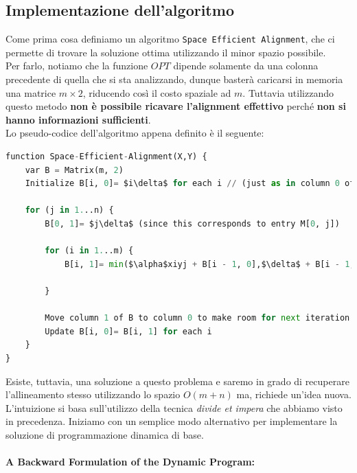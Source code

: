 \subsection{Implementazione dell'algoritmo}

Come prima cosa definiamo un algoritmo
\texttt{Space\ Efficient\ Alignment}, che ci permette di trovare la
soluzione ottima utilizzando il minor spazio possibile.\\ Per farlo,
notiamo che la funzione $OPT$ dipende solamente da una colonna
precedente di quella che si sta analizzando, dunque basterà caricarsi in
memoria una matrice $m \times 2$, riducendo così il costo spaziale ad
$m$. Tuttavia utilizzando questo metodo \textbf{non è possibile
	ricavare l'alignment effettivo} perché \textbf{non si hanno informazioni
	sufficienti}.\\

Lo pseudo-codice dell'algoritmo appena definito è il seguente:

\begin{lstlisting}[language=Python, mathescape=true]
function Space-Efficient-Alignment(X,Y) {
    var B = Matrix(m, 2)
    Initialize B[i, 0]= $i\delta$ for each i // (just as in column 0 of M)

    for (j in 1...n) {
        B[0, 1]= $j\delta$ (since this corresponds to entry M[0, j])

        for (i in 1...m) {
            B[i, 1]= min($\alpha$xiyj + B[i - 1, 0],$\delta$ + B[i - 1, 1], $\delta$ + B[i, 0])

        }

        Move column 1 of B to column 0 to make room for next iteration:
        Update B[i, 0]= B[i, 1] for each i
    }
}
\end{lstlisting}

Esiste, tuttavia, una soluzione a questo problema e saremo in grado di
recuperare l'allineamento stesso utilizzando lo spazio $O(m + n)$ ma,
richiede un'idea nuova. L'intuizione si basa sull'utilizzo della tecnica
\emph{divide et impera} che abbiamo visto in precedenza. Iniziamo con un
semplice modo alternativo per implementare la soluzione di
programmazione dinamica di base.

\paragraph{A Backward Formulation of the Dynamic Program:}\

